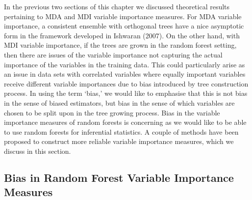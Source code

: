 \documentclass[12pt,twoside]{reedthesis}
\theoremstyle{definition}
\theoremstyle{definition}
\theoremstyle{definition}
\theoremstyle{remark}
\begin{document}
In the previous two sections of this chapter we discussed theoretical
results pertaining to MDA and MDI variable importance measures. For MDA
variable importance, a consistent ensemble with orthogonal trees have a
nice asymptotic form in the framework developed in Ishwaran (2007). On
the other hand, with MDI variable importance, if the trees are grown in
the random forest setting, then there are issues of the variable
importance not capturing the actual importance of the variables in the
training data. This could particularly arise as an issue in data sets
with correlated variables where equally important variables receive
different variable importances due to bias introduced by tree
construction process. In using the term `bias,' we would like to
emphasise that this is not bias in the sense of biased estimators, but
bias in the sense of which variables are chosen to be split upon in the
tree growing process. Bias in the variable importance measures of random
forests is concerning as we would like to be able to use random forests
for inferential statistics. A couple of methods have been proposed to
construct more reliable variable importance measures, which we discuss
in this section. \par

\subsection{Bias in Random Forest Variable Importance
Measures}\label{bias-in-random-forest-variable-importance-measures}
\end{document}

